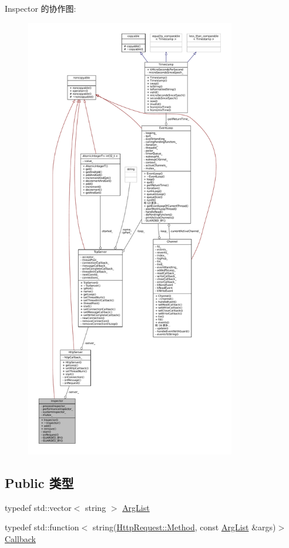 Inspector 的协作图\+:
\nopagebreak
\begin{figure}[H]
\begin{center}
\leavevmode
\includegraphics[height=550pt]{classmuduo_1_1net_1_1Inspector__coll__graph}
\end{center}
\end{figure}
\subsection*{Public 类型}
\begin{DoxyCompactItemize}
\item 
typedef std\+::vector$<$ string $>$ \hyperlink{classmuduo_1_1net_1_1Inspector_aa22799cd3b4f56688d431d68c2d014a0}{Arg\+List}
\item 
typedef std\+::function$<$ string(\hyperlink{classmuduo_1_1net_1_1HttpRequest_a2a3c0067e44c5ef3210a256d06c16b0f}{Http\+Request\+::\+Method}, const \hyperlink{classmuduo_1_1net_1_1Inspector_aa22799cd3b4f56688d431d68c2d014a0}{Arg\+List} \&args)$>$ \hyperlink{classmuduo_1_1net_1_1Inspector_a9b3d030deba315670a7da29b78586217}{Callback}
\end{DoxyCompactItemize}
